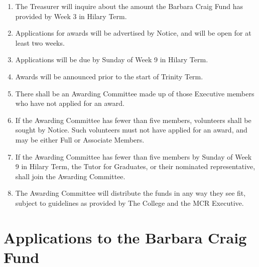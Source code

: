 \documentclass[11pt, a4paper]{article}
\begin{document}
\begin{enumerate}
	\item The Treasurer will inquire about the amount the Barbara Craig Fund has provided by Week 3 in Hilary Term.
	\item Applications for awards will be advertised by Notice, and will be open for at least two weeks.
    \item Applications will be due by Sunday of Week 9 in Hilary Term.
    \item Awards will be announced prior to the start of Trinity Term.
	\item There shall be an Awarding Committee made up of those Executive members who have not applied for an award.
	\item If the Awarding Committee has fewer than five members, volunteers shall be sought by Notice.  Such volunteers must not have applied for an award, and may be either Full or Associate Members.
	\item If the Awarding Committee has fewer than five members by Sunday of Week 9 in Hilary Term, the Tutor for Graduates, or their nominated representative, shall join the Awarding Committee.
    \item The Awarding Committee will distribute the funds in any way they see fit, subject to guidelines as provided by The College and the MCR Executive.
    
\end{enumerate}





\section{Applications to the Barbara Craig Fund}
\label{sec:applications}
\end{document}
